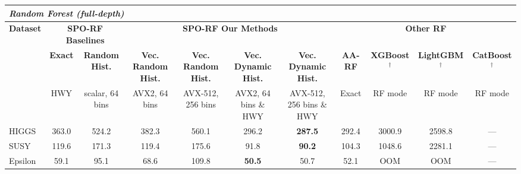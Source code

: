 \begin{tabular}{l|cc|cccc|cccc}
\hline
\multicolumn{11}{l}{\textit{Random Forest (full-depth)}} \\
\hline
\multirow{3}{*}{\textbf{Dataset}} & \multicolumn{2}{c|}{\textbf{SPO-RF Baselines}} & \multicolumn{4}{c|}{\textbf{SPO-RF Our Methods}} & \multicolumn{4}{c}{\textbf{Other RF}} \\
 & \textbf{Exact} & \textbf{Random Hist.} & \textbf{Vec. Random Hist.} & \textbf{Vec. Random Hist.} & \textbf{Vec. Dynamic Hist.} & \textbf{Vec. Dynamic Hist.} & \textbf{AA-RF} & \textbf{XGBoost}$^\dagger$ & \textbf{LightGBM}$^\dagger$ & \textbf{CatBoost}$^\dagger$ \\
 & \scriptsize HWY & \scriptsize scalar, 64 bins & \scriptsize AVX2, 64 bins & \scriptsize AVX-512, 256 bins & \scriptsize AVX2, 64 bins \& HWY & \scriptsize AVX-512, 256 bins \& HWY & \scriptsize Exact & \scriptsize RF mode & \scriptsize RF mode & \scriptsize RF mode \\
\hline
HIGGS & 363.0 & 524.2 & 382.3 & 560.1 & 296.2 & \textbf{287.5} & 292.4 & 3000.9 & 2598.8 & --- \\
SUSY & 119.6 & 171.3 & 119.4 & 175.6 & 91.8 & \textbf{90.2} & 104.3 & 1048.6 & 2281.1 & --- \\
Epsilon & 59.1 & 95.1 & 68.6 & 109.8 & \textbf{50.5} & 50.7 & 52.1 & OOM & OOM & --- \\
\hline
\end{tabular}
